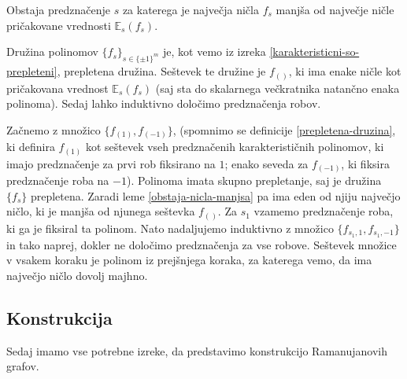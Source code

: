 \begin{izrek}
    Obstaja predznačenje \(s\) za katerega je največja ničla \(f_s\) manjša od največje ničle pričakovane vrednosti \(\mathbb E_{s}(f_s)\).
\end{izrek}
\begin{dokaz}
    Družina polinomov \(\{f_s\}_{s\in\{\pm1\}^m}\) je, kot vemo iz izreka \ref{karakteristicni-so-prepleteni}, prepletena družina. Seštevek te družine je \(f_{()}\), ki ima enake ničle kot pričakovana vrednost \(\mathbb E_{s}(f_s)\) (saj sta do skalarnega večkratnika natančno enaka polinoma). Sedaj lahko induktivno določimo predznačenja robov.

    Začnemo z množico \(\{f_{(1)}, f_{(-1)}\}\), (spomnimo se definicije \ref{prepletena-druzina}, ki definira \(f_{(1)}\) kot seštevek vseh predznačenih karakterističnih polinomov, ki imajo predznačenje za prvi rob fiksirano na \(1\); enako seveda za \(f_{(-1)}\), ki fiksira predznačenje roba na \(-1\)). Polinoma imata skupno prepletanje, saj je družina \(\{f_s\}\) prepletena. Zaradi leme \ref{obstaja-nicla-manjsa} pa ima eden od njiju največjo ničlo, ki je manjša od njunega seštevka \(f_{()}\). Za \(s_1\) vzamemo predznačenje roba, ki ga je fiksiral ta polinom. Nato nadaljujemo induktivno z množico \(\{f_{s_1, 1}, f_{s_1, -1}\}\) in tako naprej, dokler ne določimo predznačenja za vse robove. Seštevek množice v vsakem koraku je polinom iz prejšnjega koraka, za katerega vemo, da ima največjo ničlo dovolj majhno. 
\end{dokaz}

\subsection{Konstrukcija}
Sedaj imamo vse potrebne izreke, da predstavimo konstrukcijo Ramanujanovih grafov.

